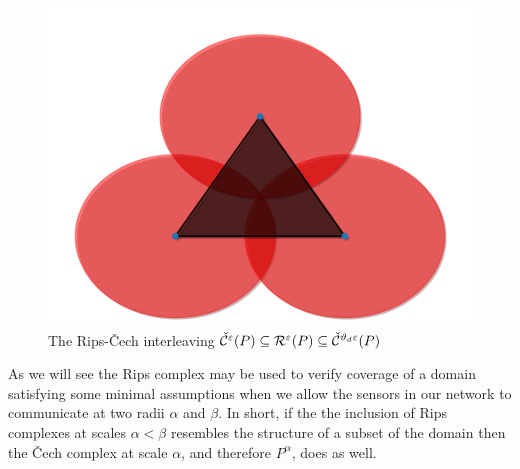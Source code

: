 \begin{figure}[htbp]
     \includegraphics[scale=0.23]{figures/include3.pdf}
     \caption{The Rips-\v Cech interleaving $\check{\mathcal{C}}^\varepsilon(P) \subseteq \mathcal{R}^\varepsilon(P) \subseteq \check{\mathcal{C}}^{\vartheta_d \varepsilon}(P)$ }
     \label{fig:incluson}
 \end{figure}

As we will see the Rips complex may be used to verify coverage of a domain satisfying some minimal assumptions when we allow the sensors in our network to communicate at two radii $\alpha$ and $\beta$.
In short, if the the inclusion of Rips complexes at scales $\alpha < \beta$ resembles the structure of a subset of the domain then the \v Cech complex at scale $\alpha$, and therefore $P^\alpha$, does as well.

